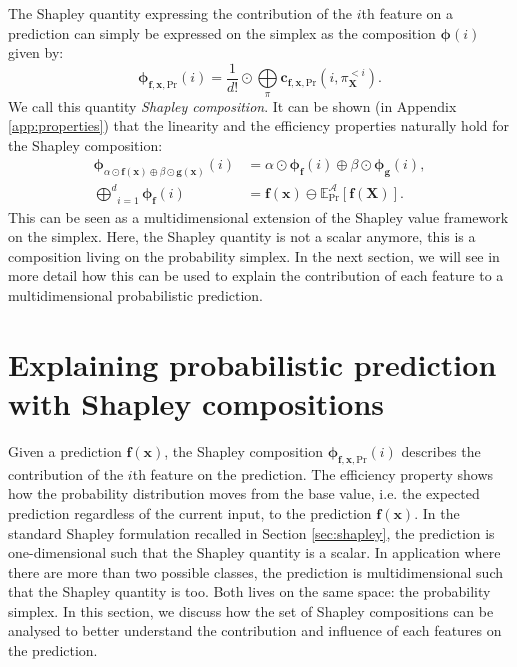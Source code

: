 \documentclass{article}
\theoremstyle{plain}
\theoremstyle{definition}
\theoremstyle{remark}
\begin{document}
The Shapley quantity expressing the contribution of the $i$th feature on a prediction can simply be expressed on the simplex as the composition $\bm{\phi}(i)$ given by:
\begin{equation}
  \bm{\phi}_{\bm{f},\bm{x},\text{Pr}}(i) = \frac{1}{d!} \odot \underset{\pi}{\bigoplus}\bm{c}_{\bm{f},\bm{x},\text{Pr}}(i,\pi^{<i}_{\bm{X}}).
\end{equation}
We call this quantity \emph{Shapley composition}. It can be shown (in Appendix \ref{app:properties}) that the linearity and the efficiency properties naturally hold for the Shapley composition:
\begin{equation}
  \begin{aligned}
    \bm{\phi}_{\alpha \odot \bm{f}(\bm{x}) \oplus \beta \odot \bm{g}(\bm{x})}(i) &= \alpha \odot \bm{\phi}_{\bm{f}}(i) \oplus \beta\odot \bm{\phi}_{\bm{g}}(i),\\
    \underset{i=1}{\overset{d}\bigoplus} \bm{\phi}_{\bm{f}}(i) &= \bm{f}(\bm{x}) \ominus \mathbb{E}^{\mathcal{A}}_{\text{Pr}}[\bm{f}(\bm{X})].
  \end{aligned}
\end{equation}
This can be seen as a multidimensional extension of the Shapley value framework on the simplex. Here, the Shapley quantity is not a scalar anymore, this is a composition living on the probability simplex. In the next section, we will see in more detail how this can be used to explain the contribution of each feature to a multidimensional probabilistic prediction.

\section{Explaining probabilistic prediction with Shapley compositions}
\label{sec:explain}

Given a prediction $\bm{f}(\bm{x})$, the Shapley composition $\bm{\phi}_{\bm{f},\bm{x},\text{Pr}}(i)$ describes the contribution of the $i$th feature on the prediction. The efficiency property shows how the probability distribution moves from the base value, i.e. the expected prediction regardless of the current input, to the prediction $\bm{f}(\bm{x})$. In the standard Shapley formulation recalled in Section \ref{sec:shapley}, the prediction is one-dimensional such that the Shapley quantity is a scalar. In application where there are more than two possible classes, the prediction is multidimensional such that the Shapley quantity is too. Both lives on the same space: the probability simplex. In this section, we discuss how the set of Shapley compositions can be analysed to better understand the contribution and influence of each features on the prediction.
\end{document}
